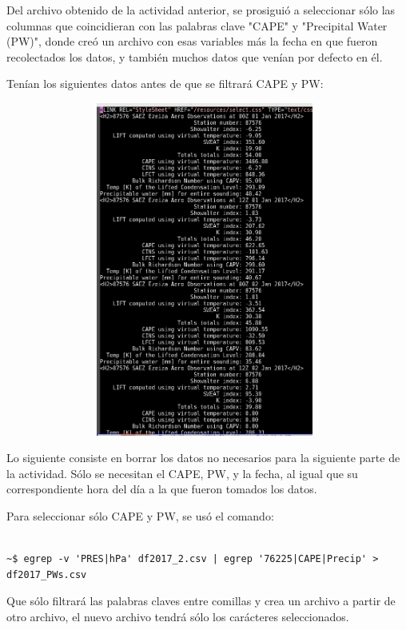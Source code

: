 \documentclass{article}
\begin{document}
Del archivo obtenido de la actividad anterior, se prosiguió a seleccionar sólo las columnas que coincidieran con las palabras clave "CAPE" y "Precipital Water (PW)", donde creó un archivo con esas variables más la fecha en que fueron recolectados los datos, y también muchos datos que venían por defecto en él.

Tenían los siguientes datos antes de que se filtrará CAPE y PW:

\begin{figure}[h!]
  \includegraphics[width=11cm, height=11cm]{original.png}
  \caption{}
  \label{}
\end{figure}

\newpage

Lo siguiente consiste en borrar los datos no necesarios para la siguiente parte de la actividad. Sólo se necesitan el CAPE, PW, y la fecha, al igual que su correspondiente hora del día a la que fueron tomados los datos.


Para seleccionar sólo CAPE y PW, se usó el comando:

\begin{verbatim}

~$ egrep -v 'PRES|hPa' df2017_2.csv | egrep '76225|CAPE|Precip' > df2017_PWs.csv

\end{verbatim}

Que sólo filtrará las palabras claves entre comillas y crea un archivo a partir de otro archivo, el nuevo archivo tendrá sólo los carácteres seleccionados.
\end{document}
